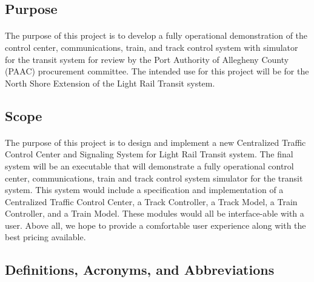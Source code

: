 \documentclass{article}
\begin{document}
    
    \subsection{Purpose}
    \paragraph{}
    The purpose of this project is to develop a fully operational demonstration of the control center, communications, train, and track control system with simulator for the transit system for review by the Port Authority of Allegheny County (PAAC) procurement committee. The intended use for this project will be for the North Shore Extension of the Light Rail Transit system.

    
    \subsection{Scope}
    \paragraph{}
     The purpose of this project is to design and implement a new Centralized Traffic Control Center and Signaling System for Light Rail Transit system. The final system will be an executable that will demonstrate a fully operational control center, communications, train and track control system simulator for the transit system. This system would include a specification and implementation of a Centralized Traffic Control Center, a Track Controller, a Track Model, a Train Controller, and a Train Model. These modules would all be interface-able with a user. Above all, we hope to provide a comfortable user experience along with the best pricing available. 

    
    \subsection{Definitions, Acronyms, and Abbreviations}
\end{document}
